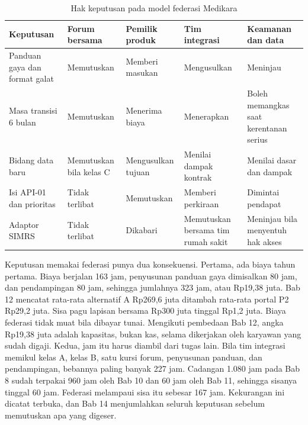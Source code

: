\begin{table}[!htb]
  \centering
  \caption{Hak keputusan pada model federasi Medikara}
  \label{tab:ch13-hak-keputusan}
  \footnotesize
  \begin{tabularx}{\textwidth}{H{2.7cm}GGGG}
    \hline
    \textbf{Keputusan} & \textbf{Forum bersama} & \textbf{Pemilik produk} & \textbf{Tim integrasi} & \textbf{Keamanan dan data} \\ \hline
    Panduan gaya dan format galat & Memutuskan & Memberi masukan & Mengusulkan & Meninjau \\ \hline
    Masa transisi 6 bulan & Memutuskan & Menerima biaya & Menerapkan & Boleh memangkas saat kerentanan serius \\ \hline
    Bidang data baru & Memutuskan bila kelas C & Mengusulkan tujuan & Menilai dampak kontrak & Menilai dasar dan dampak \\ \hline
    Isi API-01 dan prioritas & Tidak terlibat & Memutuskan & Memberi perkiraan & Dimintai pendapat \\ \hline
    Adaptor SIMRS & Tidak terlibat & Dikabari & Memutuskan bersama tim rumah sakit & Meninjau bila menyentuh hak akses \\ \hline
  \end{tabularx}
\end{table}

Keputusan memakai federasi punya dua konsekuensi. Pertama, ada biaya tahun pertama. Biaya berjalan 163 jam, penyusunan panduan gaya dimisalkan
80 jam, dan pendampingan 80 jam, sehingga jumlahnya 323 jam, atau Rp19,38 juta. Bab 12 mencatat rata-rata alternatif A Rp269,6 juta ditambah
rata-rata portal P2 Rp29,2 juta. Sisa pagu lapisan bersama Rp300 juta tinggal Rp1,2 juta. Biaya federasi tidak muat bila dibayar tunai.
Mengikuti pembedaan Bab 12, angka Rp19,38 juta adalah kapasitas, bukan kas, selama dikerjakan oleh karyawan yang sudah digaji. Kedua, jam itu
harus diambil dari tugas lain. Bila tim integrasi memikul kelas A, kelas B, satu kursi forum, penyusunan panduan, dan pendampingan, bebannya
paling banyak 227 jam. Cadangan 1.080 jam pada Bab 8 sudah terpakai 960 jam oleh Bab 10 dan 60 jam oleh Bab 11, sehingga sisanya tinggal 60 jam.
Federasi melampaui sisa itu sebesar 167 jam. Kekurangan ini dicatat terbuka, dan Bab 14 menjumlahkan seluruh keputusan sebelum memutuskan apa yang digeser.

